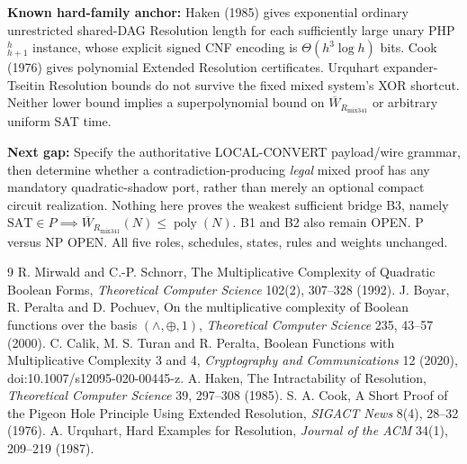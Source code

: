 \documentclass[11pt]{article}
\begin{document}
\par\noindent\textbf{Known hard-family anchor:} Haken (1985) gives exponential ordinary unrestricted shared-DAG Resolution length for each sufficiently large unary PHP$_{h+1}^{h}$ instance, whose explicit signed CNF encoding is $\Theta(h^3\log h)$ bits. Cook (1976) gives polynomial Extended Resolution certificates. Urquhart expander-Tseitin Resolution bounds do not survive the fixed mixed system's XOR shortcut. Neither lower bound implies a superpolynomial bound on $\overline W_{R_{\mathrm{mix341}}}$ or arbitrary uniform SAT time.
\par\noindent\textbf{Next gap:} Specify the authoritative LOCAL-CONVERT payload/wire grammar, then determine whether a contradiction-producing \emph{legal} mixed proof has any mandatory quadratic-shadow port, rather than merely an optional compact circuit realization. Nothing here proves the weakest sufficient bridge B3, namely $\mathrm{SAT}\in P\implies \overline W_{R_{\mathrm{mix341}}}(N)\le\operatorname{poly}(N)$. B1 and B2 also remain OPEN. P versus NP OPEN. All five roles, schedules, states, rules and weights unchanged.
\begin{thebibliography}{9}
 R. Mirwald and C.-P. Schnorr, The Multiplicative Complexity of Quadratic Boolean Forms, \emph{Theoretical Computer Science} 102(2), 307--328 (1992).
 J. Boyar, R. Peralta and D. Pochuev, On the multiplicative complexity of Boolean functions over the basis $(\wedge,\oplus,1)$, \emph{Theoretical Computer Science} 235, 43--57 (2000).
 C. Calik, M. S. Turan and R. Peralta, Boolean Functions with Multiplicative Complexity 3 and 4, \emph{Cryptography and Communications} 12 (2020), doi:10.1007/s12095-020-00445-z.
 A. Haken, The Intractability of Resolution, \emph{Theoretical Computer Science} 39, 297--308 (1985).
 S. A. Cook, A Short Proof of the Pigeon Hole Principle Using Extended Resolution, \emph{SIGACT News} 8(4), 28--32 (1976).
 A. Urquhart, Hard Examples for Resolution, \emph{Journal of the ACM} 34(1), 209--219 (1987).
\end{thebibliography}
\end{document}
